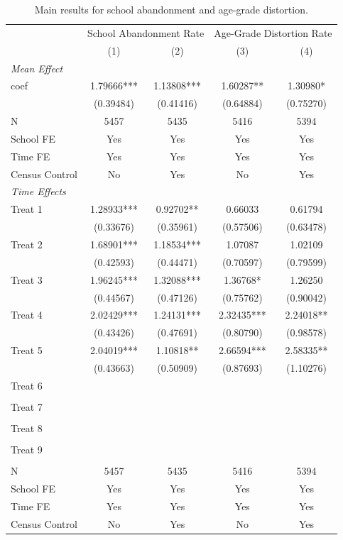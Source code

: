 \begin{table}[!htbp]
\centering
\caption{Main results for school abandonment and age-grade distortion.}
\label{tab:main_results_performance}
\begin{tabular}{lcccc}
\hline
 & \multicolumn{2}{c}{School Abandonment Rate} & \multicolumn{2}{c}{Age-Grade Distortion Rate} \\
 & (1) & (2) & (3) & (4) \\
\hline
\multicolumn{5}{l}{\textit{Mean Effect}} \\
coef & 1.79666*** & 1.13808*** & 1.60287** & 1.30980* \\
   & (0.39484) & (0.41416) & (0.64884) & (0.75270) \\
N & 5457 & 5435 & 5416 & 5394 \\
School FE & Yes & Yes & Yes & Yes \\
Time FE & Yes & Yes & Yes & Yes \\
Census Control & No & Yes & No & Yes \\
\hline
\multicolumn{5}{l}{\textit{Time Effects}} \\
Treat 1 & 1.28933*** & 0.92702** & 0.66033 & 0.61794 \\
 & (0.33676) & (0.35961) & (0.57506) & (0.63478) \\
Treat 2 & 1.68901*** & 1.18534*** & 1.07087 & 1.02109 \\
 & (0.42593) & (0.44471) & (0.70597) & (0.79599) \\
Treat 3 & 1.96245*** & 1.32088*** & 1.36768* & 1.26250 \\
 & (0.44567) & (0.47126) & (0.75762) & (0.90042) \\
Treat 4 & 2.02429*** & 1.24131*** & 2.32435*** & 2.24018** \\
 & (0.43426) & (0.47691) & (0.80790) & (0.98578) \\
Treat 5 & 2.04019*** & 1.10818** & 2.66594*** & 2.58335** \\
 & (0.43663) & (0.50909) & (0.87693) & (1.10276) \\
Treat 6 &  &  &  &  \\
 &  &  &  &  \\
Treat 7 &  &  &  &  \\
 &  &  &  &  \\
Treat 8 &  &  &  &  \\
 &  &  &  &  \\
Treat 9 &  &  &  &  \\
 &  &  &  &  \\
N & 5457 & 5435 & 5416 & 5394 \\
School FE & Yes & Yes & Yes & Yes \\
Time FE & Yes & Yes & Yes & Yes \\
Census Control & No & Yes & No & Yes \\
\hline
\end{tabular}
\end{table}
